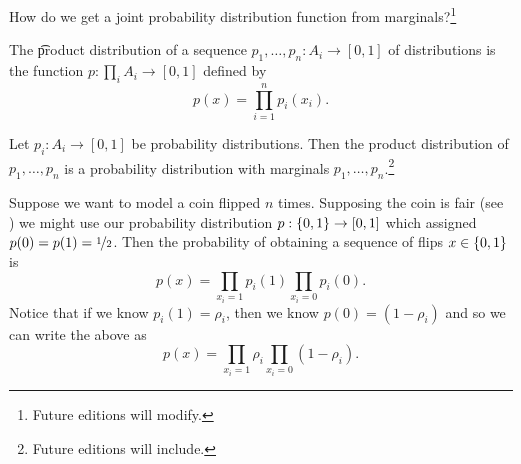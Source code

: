 

How do we get a joint probability distribution function from marginals?\footnote{Future editions will modify.}


The \t{product distribution} of a sequence $p_1, \dots, p_n: A_i \to [0, 1]$ of distributions is the function $p: \prod_{i} A_i \to [0, 1]$ defined by
\[
  p(x) = \prod_{i = 1}^{n} p_i(x_i).
\]

\begin{proposition}
  Let $p_i: A_i \to [0, 1]$ be probability distributions.
  Then the product distribution of $p_1, \dots, p_n$ is a probability distribution with marginals $p_1, \dots, p_n$.\footnote{Future editions will include.}
\end{proposition}


Suppose we want to model a coin flipped $n$ times.
Supposing the coin is fair (see ) we might use our probability distribution $p: \{0, 1\} \to [0, 1]$ which assigned $p(0) = p(1) = \nicefrac{1}{2}$.
Then the probability of obtaining a sequence of flips $x \in \{0, 1\}$ is
\[
  p(x) = \prod_{x_i = 1} p_i(1) \prod_{x_i = 0} p_i(0).
\]
Notice that if we know $p_i(1) = \rho_i$, then we know $p(0) = (1-\rho_i)$ and so we can write the above as
\[
  p(x) = \prod_{x_i = 1} \rho_i \prod_{x_i = 0} (1-\rho_i).
\]
